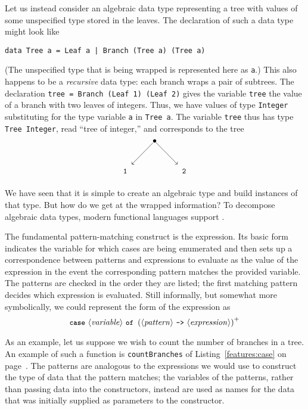 Let us instead consider an algebraic data type representing a tree with values of some unspecified type stored in the leaves. The declaration of such a data type might look like \begin{lstlisting}
data Tree a = Leaf a | Branch (Tree a) (Tree a)
\end{lstlisting}
(The unspecified type that is being wrapped is represented here as \lstinline{a}.) This also happens to be a \emph{recursive} data type: each branch wraps a pair of subtrees. The declaration \lstinline{tree = Branch (Leaf 1) (Leaf 2)} gives the variable \lstinline{tree} the value of a branch with two leaves of integers. Thus, we have values of type \lstinline{Integer} substituting for the type variable \lstinline{a} in \lstinline{Tree a}. The variable \lstinline{tree} thus has type \mbox{\lstinline{Tree Integer}}, read ``tree of integer,'' and corresponds to the tree
\[
\begin{xy}\SelectTips{eu}{10}
\xymatrix{%
&*{\bullet}\ar[dl] \ar[dr]\\
*++\txt{\code{1}}&&*++\txt{\code{2}}}
\end{xy}
\]

We have seen that it is simple to create an algebraic type and build instances of that type. But how do we get at the wrapped information? To decompose algebraic data types, modern functional languages support .

The fundamental pattern-matching construct is the  expression. Its basic form indicates the variable for which cases are being enumerated and then sets up a correspondence between patterns and expressions to evaluate as the value of the  expression in the event the corresponding pattern matches the provided variable. The patterns are checked in the order they are listed; the first matching pattern decides which expression is evaluated. Still informally, but somewhat more symbolically, we could represent the form of the  expression as
\[
\text{\text{\small\ttfamily case} } \langle\text{\textit{variable}}\rangle \text{ \text{\small\ttfamily of} } \left (\langle\text{\textit{pattern}}\rangle \text{ \text{\small\ttfamily ->} } \langle\text{\textit{expression}}\rangle \right)^{+}
\]

As an example, let us suppose we wish to count the number of branches in a tree. An example of such a function is \lstinline{countBranches} of Listing~\ref{features:case} on page~\pageref{features:case}. The patterns are analogous to the expressions we would use to construct the type of data that the pattern matches; the variables of the patterns, rather than passing data into the constructors, instead are used as names for the data that was initially supplied as parameters to the constructor.

